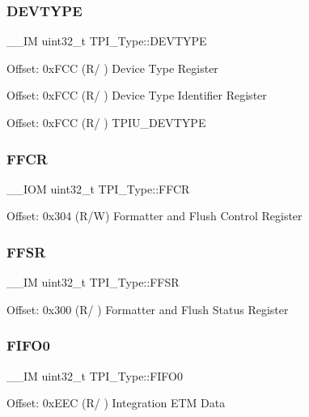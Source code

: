 \subsubsection{\texorpdfstring{DEVTYPE}{DEVTYPE}}
{\footnotesize\ttfamily \+\_\+\+\_\+\+IM uint32\+\_\+t T\+P\+I\+\_\+\+Type\+::\+D\+E\+V\+T\+Y\+PE}

Offset\+: 0x\+F\+CC (R/ ) Device Type Register

Offset\+: 0x\+F\+CC (R/ ) Device Type Identifier Register

Offset\+: 0x\+F\+CC (R/ ) T\+P\+I\+U\+\_\+\+D\+E\+V\+T\+Y\+PE \mbox{\label{struct_t_p_i___type_a3f68b6e73561b4849ebf953a894df8d2}} 
\subsubsection{\texorpdfstring{FFCR}{FFCR}}
{\footnotesize\ttfamily \+\_\+\+\_\+\+I\+OM uint32\+\_\+t T\+P\+I\+\_\+\+Type\+::\+F\+F\+CR}

Offset\+: 0x304 (R/W) Formatter and Flush Control Register \mbox{\label{struct_t_p_i___type_a6c47a0b4c7ffc66093ef993d36bb441c}} 
\subsubsection{\texorpdfstring{FFSR}{FFSR}}
{\footnotesize\ttfamily \+\_\+\+\_\+\+IM uint32\+\_\+t T\+P\+I\+\_\+\+Type\+::\+F\+F\+SR}

Offset\+: 0x300 (R/ ) Formatter and Flush Status Register \mbox{\label{struct_t_p_i___type_aa4d7b5cf39dff9f53bf7f69bc287a814}} 
\subsubsection{\texorpdfstring{FIFO0}{FIFO0}}
{\footnotesize\ttfamily \+\_\+\+\_\+\+IM uint32\+\_\+t T\+P\+I\+\_\+\+Type\+::\+F\+I\+F\+O0}

Offset\+: 0x\+E\+EC (R/ ) Integration E\+TM Data \mbox{\label{struct_t_p_i___type_a061372fcd72f1eea871e2d9c1be849bc}} 
